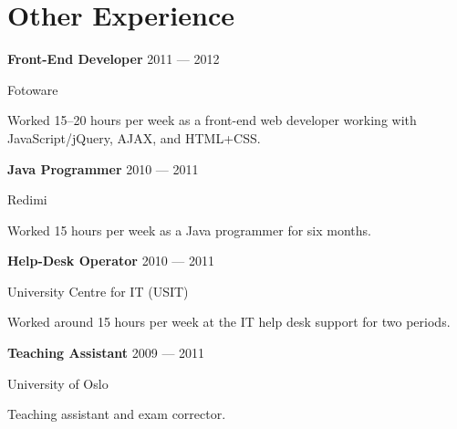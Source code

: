 \section{Other Experience}
\parbox[t][][t]{\linewidth}{
	\parbox{\linewidth}{\textbf{Front-End Developer} \hfill {{2011 --- 2012}}}
	\parbox{\linewidth}{Fotoware}
	\smallbreak
	\smallskip
	Worked 15--20 hours per week as a front-end web developer working with
	JavaScript/jQuery, AJAX, and HTML+CSS.
	\bigbreak
	\smallskip
}

\parbox[t][][t]{\linewidth}{
	\parbox{\linewidth}{\textbf{Java Programmer} \hfill {{2010 --- 2011}}}
	\parbox{\linewidth}{Redimi}
	\smallbreak
	\smallskip
	Worked 15 hours per week as a Java programmer for six months.
	\bigbreak
	\smallskip
}

\parbox[t][][t]{\linewidth}{
	\parbox{\linewidth}{\textbf{Help-Desk Operator} \hfill {{2010 --- 2011}}}
	\parbox{\linewidth}{University Centre for IT (USIT)}
	\smallbreak
	\smallskip
	Worked around 15 hours per week at the IT help desk support for two
	periods.
	\bigbreak
	\smallskip
}

\parbox[t][][t]{\linewidth}{
	\parbox{\linewidth}{\textbf{Teaching Assistant} \hfill {{2009 --- 2011}}}
	\parbox{\linewidth}{University of Oslo}
	\smallbreak
	\smallskip
	Teaching assistant and exam corrector.
	\bigbreak
	\smallskip
}


